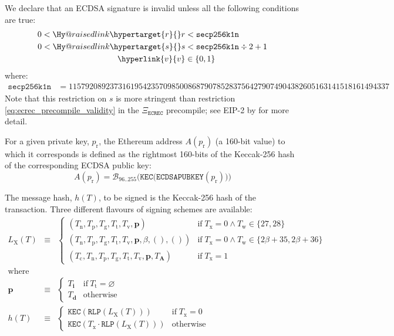 \documentclass[9pt,oneside]{amsart}
\makeatletter
\newcommand{\linkdest}[1]{\Hy@raisedlink{\hypertarget{#1}{}}}
\makeatother
\begin{document}
\linkdest{invalidsig}We declare that an ECDSA signature is invalid unless all the following conditions are true:
\begin{align}
0 < \linkdest{r}{r} &< \mathtt{secp256k1n} \\
0 < \linkdest{s}{s} &< \mathtt{secp256k1n} \div 2 + 1 \\
\hyperlink{v}{v} &\in \{0,1\}
\end{align}
where:
\begin{align}
\mathtt{secp256k1n} &= 115792089237316195423570985008687907852837564279074904382605163141518161494337
\end{align}
Note that this restriction on $s$ is more stringent than restriction \ref{eq:ecrec_precompile_validity} in the $\Xi_{\mathtt{ECREC}}$ precompile; see EIP-2 by \cite{EIP-2} for more detail.

For a given private key, $p_{\mathrm{r}}$, the Ethereum address $A(p_{\mathrm{r}})$ (a 160-bit value) to which it corresponds is defined as the rightmost 160-bits of the Keccak-256 hash of the corresponding ECDSA public key:
\begin{equation}
A(p_{\mathrm{r}}) = \mathcal{B}_{96..255}\big(\mathtt{KEC}\big( \mathtt{ECDSAPUBKEY}(p_{\mathrm{r}}) \big) \big)
\end{equation}

\hypertarget{h_of_T}{}The message hash, $h(T)$, to be signed is the Keccak-256 hash of the transaction. Three different flavours of signing schemes are available:
\begin{eqnarray}
L_{\mathrm{X}}(T) & \equiv & \begin{cases}
(T_{\mathrm{n}}, T_{\mathrm{p}}, T_{\mathrm{g}}, T_{\mathrm{t}}, T_{\mathrm{v}}, \mathbf{p}) & \text{if} \; T_{\mathrm{x}} = 0 \land T_{\mathrm{w}} \in \{27, 28\} \\
(T_{\mathrm{n}}, T_{\mathrm{p}}, T_{\mathrm{g}}, T_{\mathrm{t}}, T_{\mathrm{v}}, \mathbf{p}, \beta, (), ()) & \text{if} \; T_{\mathrm{x}} = 0 \land T_{\mathrm{w}} \in \{2\beta + 35, 2\beta + 36\} \\
(T_{\mathrm{c}}, T_{\mathrm{n}}, T_{\mathrm{p}}, T_{\mathrm{g}}, T_{\mathrm{t}}, T_{\mathrm{v}}, \mathbf{p}, T_{\mathbf{A}}) & \text{if} \; T_{\mathrm{x}} = 1
\end{cases} \\
\nonumber \text{where} \\
\nonumber \mathbf{p} & \equiv & \begin{cases}
T_{\mathbf{i}} & \text{if}\ T_{\mathrm{t}} = \varnothing \\
T_{\mathbf{d}} & \text{otherwise}
\end{cases} \\
h(T) & \equiv & \begin{cases}
\mathtt{KEC}( \mathtt{RLP}(L_{\mathrm{X}}(T)) ) & \text{if} \; T_{\mathrm{x}} = 0 \\
\mathtt{KEC}( T_{\mathrm{x}} \cdot \mathtt{RLP}(L_{\mathrm{X}}(T)) ) & \text{otherwise}
\end{cases}
\end{eqnarray}
\end{document}

